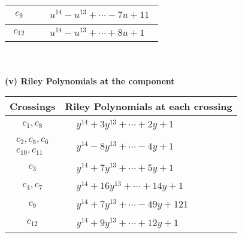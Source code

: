 \documentclass[1p]{elsarticle_modified}
\theoremstyle{definition}
\begin{document}
\begin{tabular}{m{50pt}|m{274pt}}
\hline $$\begin{aligned}c_{9}\end{aligned}$$&$\begin{aligned}
&u^{14}- u^{13}+\cdots-7 u+11
\end{aligned}$\\
\hline $$\begin{aligned}c_{12}\end{aligned}$$&$\begin{aligned}
&u^{14}- u^{13}+\cdots+8 u+1
\end{aligned}$\\
\hline
\end{tabular}\\~\\
\newpage\renewcommand{\arraystretch}{1}
\flushleft \textbf{(v) Riley Polynomials at the component}\newline \\
\begin{tabular}{m{50pt}|m{274pt}}
Crossings & \hspace{64pt}Riley Polynomials at each crossing \\
\hline $$\begin{aligned}c_{1},c_{8}\end{aligned}$$&$\begin{aligned}
&y^{14}+3 y^{13}+\cdots+2 y+1
\end{aligned}$\\
\hline $$\begin{aligned}c_{2},c_{5},c_{6}\\c_{10},c_{11}\end{aligned}$$&$\begin{aligned}
&y^{14}-8 y^{13}+\cdots-4 y+1
\end{aligned}$\\
\hline $$\begin{aligned}c_{3}\end{aligned}$$&$\begin{aligned}
&y^{14}+7 y^{13}+\cdots+5 y+1
\end{aligned}$\\
\hline $$\begin{aligned}c_{4},c_{7}\end{aligned}$$&$\begin{aligned}
&y^{14}+16 y^{13}+\cdots+14 y+1
\end{aligned}$\\
\hline $$\begin{aligned}c_{9}\end{aligned}$$&$\begin{aligned}
&y^{14}+7 y^{13}+\cdots-49 y+121
\end{aligned}$\\
\hline $$\begin{aligned}c_{12}\end{aligned}$$&$\begin{aligned}
&y^{14}+9 y^{13}+\cdots+12 y+1
\end{aligned}$\\
\hline
\end{tabular}\\~\\
\end{document}
